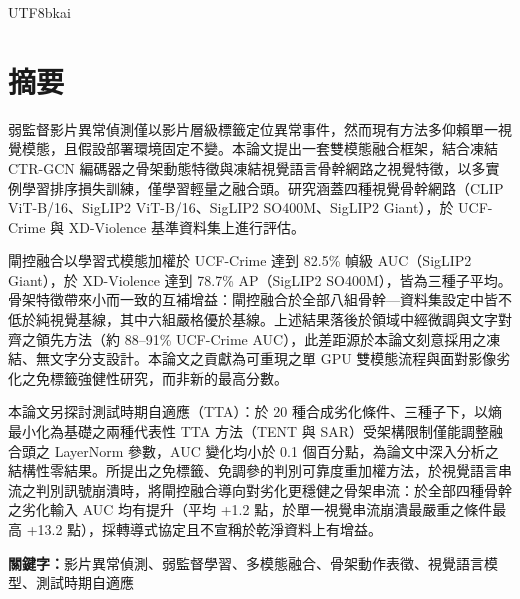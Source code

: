 \begin{CJK}{UTF8}{bkai}
\chapter*{摘要}

弱監督影片異常偵測僅以影片層級標籤定位異常事件，然而現有方法多仰賴單一視覺模態，且假設部署環境固定不變。本論文提出一套雙模態融合框架，結合凍結 CTR-GCN 編碼器之骨架動態特徵與凍結視覺語言骨幹網路之視覺特徵，以多實例學習排序損失訓練，僅學習輕量之融合頭。研究涵蓋四種視覺骨幹網路（CLIP ViT-B/16、SigLIP2 ViT-B/16、SigLIP2 SO400M、SigLIP2 Giant），於 UCF-Crime 與 XD-Violence 基準資料集上進行評估。

閘控融合以學習式模態加權於 UCF-Crime 達到 82.5\% 幀級 AUC（SigLIP2 Giant），於 XD-Violence 達到 78.7\% AP（SigLIP2 SO400M），皆為三種子平均。骨架特徵帶來小而一致的互補增益：閘控融合於全部八組骨幹—資料集設定中皆不低於純視覺基線，其中六組嚴格優於基線。上述結果落後於領域中經微調與文字對齊之領先方法（約 88--91\% UCF-Crime AUC），此差距源於本論文刻意採用之凍結、無文字分支設計。本論文之貢獻為可重現之單 GPU 雙模態流程與面對影像劣化之免標籤強健性研究，而非新的最高分數。

本論文另探討測試時期自適應（TTA）：於 20 種合成劣化條件、三種子下，以熵最小化為基礎之兩種代表性 TTA 方法（TENT 與 SAR）受架構限制僅能調整融合頭之 LayerNorm 參數，AUC 變化均小於 0.1 個百分點，為論文中深入分析之結構性零結果。所提出之免標籤、免調參的判別可靠度重加權方法，於視覺語言串流之判別訊號崩潰時，將閘控融合導向對劣化更穩健之骨架串流：於全部四種骨幹之劣化輸入 AUC 均有提升（平均 +1.2 點，於單一視覺串流崩潰最嚴重之條件最高 +13.2 點），採轉導式協定且不宣稱於乾淨資料上有增益。

\vspace{1.5em}
\noindent\textbf{關鍵字：}影片異常偵測、弱監督學習、多模態融合、骨架動作表徵、視覺語言模型、測試時期自適應
\end{CJK}
